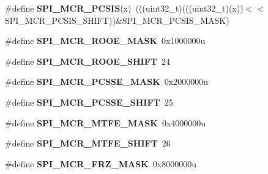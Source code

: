 \begin{DoxyCompactItemize}
\item 
\#define {\bfseries S\+P\+I\+\_\+\+M\+C\+R\+\_\+\+P\+C\+S\+IS}(x)~(((uint32\+\_\+t)(((uint32\+\_\+t)(x))$<$$<$S\+P\+I\+\_\+\+M\+C\+R\+\_\+\+P\+C\+S\+I\+S\+\_\+\+S\+H\+I\+FT))\&S\+P\+I\+\_\+\+M\+C\+R\+\_\+\+P\+C\+S\+I\+S\+\_\+\+M\+A\+SK)\hypertarget{group__SPI__Register__Masks_ga81637c9ef8f34bdb499086de99c99858}{}\label{group__SPI__Register__Masks_ga81637c9ef8f34bdb499086de99c99858}

\item 
\#define {\bfseries S\+P\+I\+\_\+\+M\+C\+R\+\_\+\+R\+O\+O\+E\+\_\+\+M\+A\+SK}~0x1000000u\hypertarget{group__SPI__Register__Masks_ga2f3c41dcffc0058ae83ae7b1dbfffd86}{}\label{group__SPI__Register__Masks_ga2f3c41dcffc0058ae83ae7b1dbfffd86}

\item 
\#define {\bfseries S\+P\+I\+\_\+\+M\+C\+R\+\_\+\+R\+O\+O\+E\+\_\+\+S\+H\+I\+FT}~24\hypertarget{group__SPI__Register__Masks_ga78f4dfaad41aae2ee10979f2e248e4d3}{}\label{group__SPI__Register__Masks_ga78f4dfaad41aae2ee10979f2e248e4d3}

\item 
\#define {\bfseries S\+P\+I\+\_\+\+M\+C\+R\+\_\+\+P\+C\+S\+S\+E\+\_\+\+M\+A\+SK}~0x2000000u\hypertarget{group__SPI__Register__Masks_ga479a7a3131d4356e53f7f86bd4cd0245}{}\label{group__SPI__Register__Masks_ga479a7a3131d4356e53f7f86bd4cd0245}

\item 
\#define {\bfseries S\+P\+I\+\_\+\+M\+C\+R\+\_\+\+P\+C\+S\+S\+E\+\_\+\+S\+H\+I\+FT}~25\hypertarget{group__SPI__Register__Masks_ga4dc49f49441cc797619c160757bd7d2d}{}\label{group__SPI__Register__Masks_ga4dc49f49441cc797619c160757bd7d2d}

\item 
\#define {\bfseries S\+P\+I\+\_\+\+M\+C\+R\+\_\+\+M\+T\+F\+E\+\_\+\+M\+A\+SK}~0x4000000u\hypertarget{group__SPI__Register__Masks_ga3fa9d02b4302f9963c26383bdeb35da8}{}\label{group__SPI__Register__Masks_ga3fa9d02b4302f9963c26383bdeb35da8}

\item 
\#define {\bfseries S\+P\+I\+\_\+\+M\+C\+R\+\_\+\+M\+T\+F\+E\+\_\+\+S\+H\+I\+FT}~26\hypertarget{group__SPI__Register__Masks_gaaff9ea9fcaf46dc8bfd358d941e0d3ac}{}\label{group__SPI__Register__Masks_gaaff9ea9fcaf46dc8bfd358d941e0d3ac}

\item 
\#define {\bfseries S\+P\+I\+\_\+\+M\+C\+R\+\_\+\+F\+R\+Z\+\_\+\+M\+A\+SK}~0x8000000u\hypertarget{group__SPI__Register__Masks_ga6d4131c2e45352910d630723c1172d2c}{}\label{group__SPI__Register__Masks_ga6d4131c2e45352910d630723c1172d2c}


\end{DoxyCompactItemize}
